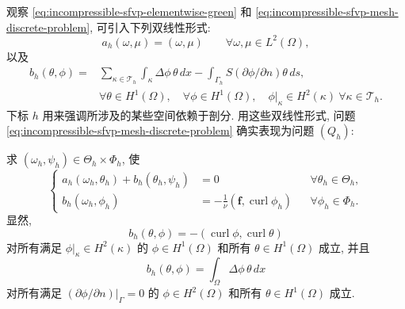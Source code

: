 观察 \eqref{eq:incompressible-sfvp-elementwise-green}
和 \eqref{eq:incompressible-sfvp-mesh-discrete-problem},
可引入下列双线性形式:
\begin{equation}\label{eq:incompressible-sfvp-mesh-form-a}
a_h(\omega,\mu)=(\omega,\mu)
\qquad\forall\omega,\mu\in L^2(\Omega),
\end{equation}
以及
\begin{equation}\label{eq:incompressible-sfvp-mesh-form-b}
\begin{split}
b_h(\theta,\phi)
={}&\sum_{\kappa\in\mathcal T_h}
\int_\kappa\Delta\phi\,\theta\,dx
-\int_{\Gamma_h}S(\partial\phi/\partial n)\theta\,ds,\\
&\forall\theta\in H^1(\Omega),
\quad\forall\phi\in H^1(\Omega),
\quad\phi|_\kappa\in H^2(\kappa)
\ \forall\kappa\in\mathcal T_h.
\end{split}
\end{equation}
下标 $h$ 用来强调所涉及的某些空间依赖于剖分.
用这些双线性形式, 问题
\eqref{eq:incompressible-sfvp-mesh-discrete-problem}
确实表现为问题 $(Q_h)$:

求 $(\omega_h,\psi_h)\in\Theta_h\times\Phi_h$, 使
\begin{equation}\label{eq:incompressible-sfvp-mesh-abstract-problem}
\left\{
\begin{aligned}
a_h(\omega_h,\theta_h)+b_h(\theta_h,\psi_h)&=0
&&\forall\theta_h\in\Theta_h,\\
b_h(\omega_h,\phi_h)&=-\frac1\nu
(\mathbf f,\operatorname{curl}\phi_h)
&&\forall\phi_h\in\Phi_h.
\end{aligned}
\right.
\end{equation}
显然,
\begin{equation}\label{eq:incompressible-sfvp-mesh-form-b-curl}
b_h(\theta,\phi)
=-(\operatorname{curl}\phi,\operatorname{curl}\theta)
\end{equation}
对所有满足 $\phi|_\kappa\in H^2(\kappa)$ 的
$\phi\in H^1(\Omega)$ 和所有 $\theta\in H^1(\Omega)$ 成立, 并且
\begin{equation}\label{eq:incompressible-sfvp-mesh-form-b-laplacian}
b_h(\theta,\phi)=\int_\Omega\Delta\phi\,\theta\,dx
\end{equation}
对所有满足 $(\partial\phi/\partial n)|_\Gamma=0$ 的
$\phi\in H^2(\Omega)$ 和所有 $\theta\in H^1(\Omega)$ 成立.


